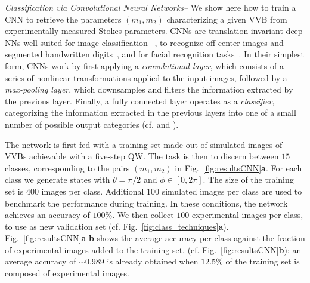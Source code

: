 \documentclass[
	aps, prl, superscriptaddress, twocolumn,
	10pt
	floatfix, 
    nofootinbib,
	tightenlines
]{revtex4-1}
\begin{document}
\textit{Classification via Convolutional Neural Networks--} We show here how to train a \ac{CNN}  to retrieve the parameters $(m_1,m_2)$ characterizing a given VVB from experimentally measured Stokes parameters.
\acp{CNN} are translation-invariant deep NNs well-suited for image classification ~\cite{lecun2015deep}, to recognize off-center images and segmented handwritten digits~\cite{Simard2003,Ciresan:2011:FHP:2283516.2283603},
and for facial recognition tasks~\cite{MATSUGU2003555}. 
In their simplest form, \acp{CNN} work by first applying a \emph{convolutional layer}, which consists of a series of nonlinear transformations applied to the input images, followed by a \emph{max-pooling layer}, which downsamples and filters the information extracted by the previous layer. Finally, a fully connected layer operates as a \emph{classifier}, categorizing the information extracted in the previous layers into one of a small number of possible output categories
(cf. \cite{SI} and ).
 
The network is first fed with a training set made out of simulated images of \ac{VVB}s achievable with a five-step \ac{QW}.
The task is then to discern between $15$ classes, corresponding to the pairs $(m_1,m_2)$ in Fig.~\ref{fig:resultsCNN}{\bf a}.
For each class we generate states with $\theta=\pi/2$ and $\phi\in[0,2\pi]$. The size of the training set is $400$ images per class. Additional $100$ simulated images per class are used to benchmark the performance during training. 
In these conditions, the network achieves an accuracy of $100\%$.
We then collect $100$ experimental images per class, to use as new validation set (cf. Fig.~\ref{fig:class_techniques}{\bf a}).
Fig.~\ref{fig:resultsCNN}{\bf a}-{\bf b} shows the average accuracy per class against the fraction of experimental images added to the training set.
\add{The addition of a small fraction of experimental images to the training set improves the capability of the network to take into account deviations between experimental states and ideal LG modes %
\cite{Rafayelyan,Shu:16,Vallone:16}.}
(cf. Fig.~\ref{fig:resultsCNN}{\bf b}): an average accuracy of $\sim 0.989$ is already obtained when $12.5\%$ of the training set is composed of experimental images.
\end{document}
